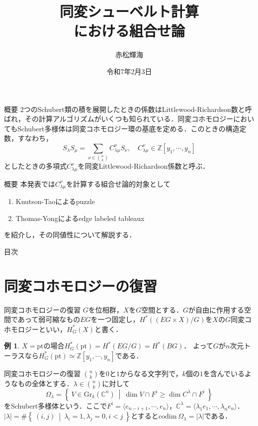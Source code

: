 \documentclass[unicode,12pt]{beamer}%
\title{同変シューベルト計算\\における組合せ論}
\author{赤松輝海}
\date{令和7年2月3日}
\institute{京都大学大学院理学研究科数学・数理解析専攻修士課程}
\theoremstyle{definition}
\theoremstyle{example}
\newtheorem{eg}[defin]{例}
\newcommand{\integer}{\mathbb{Z}}
\newcommand{\complex}{\mathbb{C}}
\newcommand{\set}[2]{\left\{\:#1\:\middle|\:#2\:\right\}}
\newcommand{\codim}[1]{\text{codim}\:#1}
\begin{document}
\begin{frame}
  \titlepage
\end{frame}

\begin{frame}{概要}
  $2$つのSchubert類の積を展開したときの係数はLittlewood-Richardson数と呼ばれ，その計算アルゴリズムがいくつも知られている．同変コホモロジーにおいてもSchubert多様体は同変コホモロジー環の基底を定める．このときの構造定数，すなわち，
  \[
  S_\lambda S_\mu = \sum_{\nu\in\binom{n}{k}}C^\nu_{\lambda\mu}S_\nu,\quad C^\nu_{\lambda\mu}\in\integer[y_1,\cdots,y_n]
  \]
  としたときの多項式$C^\nu_{\lambda\mu}$を同変Littlewood-Richardson係数と呼ぶ．
\end{frame}

\begin{frame}{概要}
  本発表では$C^\nu_{\lambda\mu}$を計算する組合せ論的対象として
  \begin{enumerate}
    \item Knutson-Taoによるpuzzle
    \item Thomas-Yongによるedge labeled tableaux
  \end{enumerate}
  を紹介し，その同値性について解説する．
\end{frame}

\begin{frame}{目次}
  \tableofcontents
\end{frame}




\section[]{同変コホモロジーの復習}

\begin{frame}{同変コホモロジーの復習}
  $G$を位相群，$X$を$G$空間とする．$G$が自由に作用する空間であって弱可縮なもの$EG$を一つ固定し，$H^*((EG\times X)/G)$を$X$の$G$同変コホモロジーといい，$H^*_G(X)$と書く．
    \begin{eg}
      $X=\text{pt}$の場合$H^*_G(\text{pt})=H^*(EG/G)= H^*(BG)$．
      よって$G$が$n$次元トーラスなら$H^*_G(\text{pt})\simeq\integer[y_1,\cdots,y_n]$である．
    \end{eg}
\end{frame}

\begin{frame}{同変コホモロジーの復習}
  $\binom{n}{k}$を$0$と$1$からなる文字列で，$k$個の$1$を含んでいるようなもの全体とする．$\lambda\in\binom{n}{k}$に対して
  \[
  \Omega_\lambda = \set{V\in \text{Gr}_k(\complex^n)}{\dim V\cap F^i \geq \dim C^\lambda\cap F^i}
  \]
  をSchubert多様体という．ここで$F^i = \langle e_{n-i+1},\cdots,e_n \rangle$，$\complex^\lambda = \langle \lambda_1e_1,\cdots,\lambda_ne_n \rangle$．$|\lambda| = \#\set{(i, j)}{\lambda_i = 1,\lambda_j = 0, i < j}$とすると$\codim\Omega_\lambda=|\lambda|$である．
\end{frame}
\end{document}
